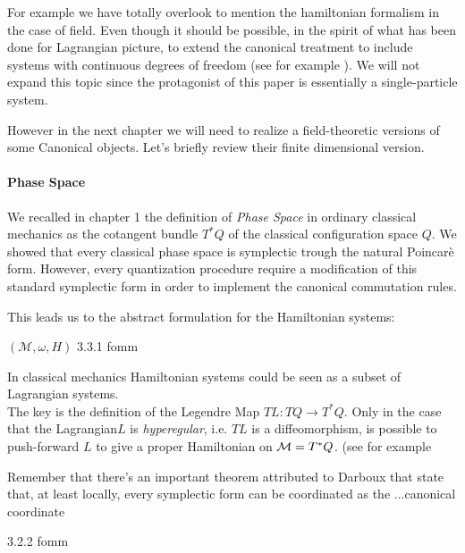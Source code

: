 \documentclass[Main]{subfiles}
\begin{document}
	For example we have totally overlook to mention the hamiltonian formalism in the case of field.
	Even though it should be possible, in the spirit of what has been done for Lagrangian picture, to extend the canonical treatment to include systems with continuous degrees of freedom (see for example \cite{Giachetta1999}).
	We will not expand this topic since the protagonist of this paper is essentially a single-particle system.
	
	However in the next chapter we will need to realize a field-theoretic versions of some Canonical objects.
	Let's briefly review their finite dimensional version.
	
			\paragraph{Phase Space}
		We recalled in chapter 1 the definition of \emph{Phase Space} in ordinary classical mechanics as the cotangent bundle $T^*Q$ of the classical configuration space $Q$.
		We showed that every classical phase space is symplectic trough the natural Poincarè form.
		However, every quantization procedure require a modification of this standard symplectic form in order to implement the canonical commutation rules.
	
	This leads us to the abstract formulation for the Hamiltonian systems\cite{Abraham1978}:
	
	\begin{definition}
	 $(\mathcal{M},\omega, H)$ 3.3.1 fomm
	\end{definition}
	
	\begin{observation}
		In classical mechanics Hamiltonian systems could be seen as a subset of Lagrangian systems.
		\\
		The key is the definition of the Legendre Map $TL: TQ \rightarrow T^*Q$. 
		Only in the case that the Lagrangian$L$  is \emph{hyperegular}, i.e. $TL$ is a diffeomorphism, is possible to push-forward $L$ to give a proper Hamiltonian on $\mathcal{M}=T^*Q$. (see for example \cite{Abraham1978}		
	\end{observation}	
	Remember that there's an important theorem attributed to Darboux that state that, at least locally, every symplectic form can be coordinated as the ...canonical coordinate
	\begin{theorem}[Darboux]
	3.2.2 fomm
	\end{theorem}
	
\end{document}
